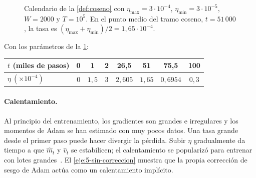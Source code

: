 \begin{figure}[h]
\centering
{}
\caption{Calendario de la \cref{def:coseno} con $\eta_{\max}=3\cdot 10^{-4}$, $\eta_{\min}=3\cdot 10^{-5}$, $W=2000$ y $T=10^{5}$. En el punto medio del tramo coseno, $t=51\,000$, la tasa es $(\eta_{\max}+\eta_{\min})/2=1{,}65\cdot 10^{-4}$.}
\label{fig:coseno}
\end{figure}

\begin{ejemplo}\label{ej:coseno}
Con los parámetros de la \cref{fig:coseno}:
\begin{center}\small
\begin{tabular}{@{}lccccccc@{}}
\toprule
$t$ (miles de pasos) & 0 & 1 & 2 & 26{,}5 & 51 & 75{,}5 & 100 \\
\midrule
$\eta\ (\times 10^{-4})$ & 0 & $1{,}5$ & $3$ & $2{,}605$ & $1{,}65$ & $0{,}6954$ & $0{,}3$ \\
\bottomrule
\end{tabular}
\end{center}
\end{ejemplo}

\paragraph{Calentamiento.} Al principio del entrenamiento, los gradientes son grandes e irregulares y los momentos de Adam se han estimado con muy pocos datos. Una tasa grande desde el primer paso puede hacer divergir la pérdida. Subir $\eta$ gradualmente da tiempo a que $\hat m_t$ y $\hat v_t$ se estabilicen; el calentamiento se popularizó para entrenar con lotes grandes~\cite{goyal}. El \cref{eje:5-sin-correccion} muestra que la propia corrección de sesgo de Adam actúa como un calentamiento implícito.

